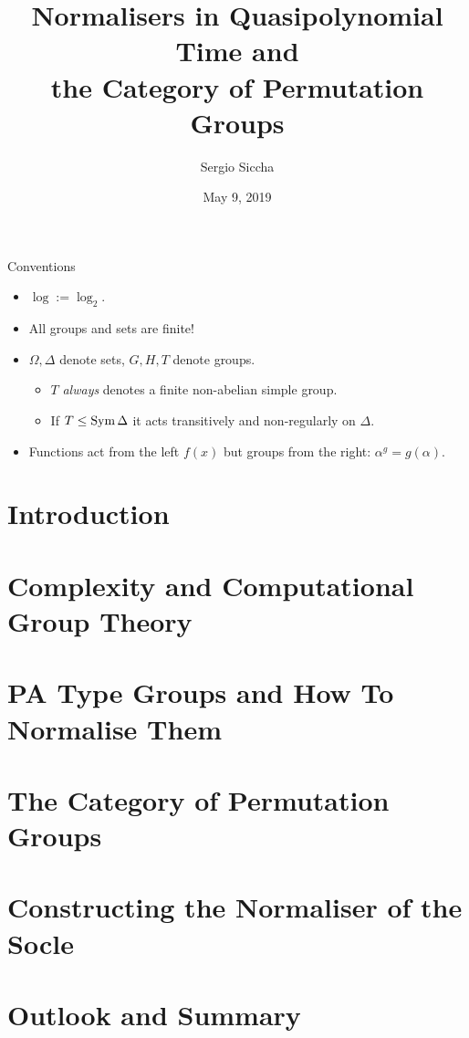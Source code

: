 \documentclass{beamer}
\title{Normalisers in Quasipolynomial Time and \\
the Category of Permutation Groups}
\date{May 9, 2019}
\author{Sergio Siccha}
\institute{Lehr- und Forschungsgebiet Algebra, RWTH Aachen}
\theoremstyle{plain}
\theoremstyle{definition}
\begin{document}
\maketitle


\begin{frame}{Conventions}
\begin{itemize}
\setlength\itemsep{1em}
\item
$\log := \log_2$.
\pause
\item
All groups and sets are finite!
\pause
\item
$\Omega, \Delta$ denote sets,
$G, H, T$ denote groups.
\pause
\begin{itemize}
    \item
    $T$ \emph{always} denotes a finite non-abelian simple group.
    \pause
    \item
    If $T \leq \operatorname{Sym} \Delta$ it acts transitively and non-regularly on $\Delta$.
    \pause
\end{itemize}
\item
Functions act from the left $f(x)$
but groups from the right: $\alpha ^ g = g(\alpha)$.
\end{itemize}
\end{frame}

\section{Introduction}


\section{Complexity and Computational Group Theory}


\section{PA Type Groups and How To Normalise Them}


\section{The Category of Permutation Groups}


\section{Constructing the Normaliser of the Socle}


\section{Outlook and Summary}


\appendix

\end{document}
